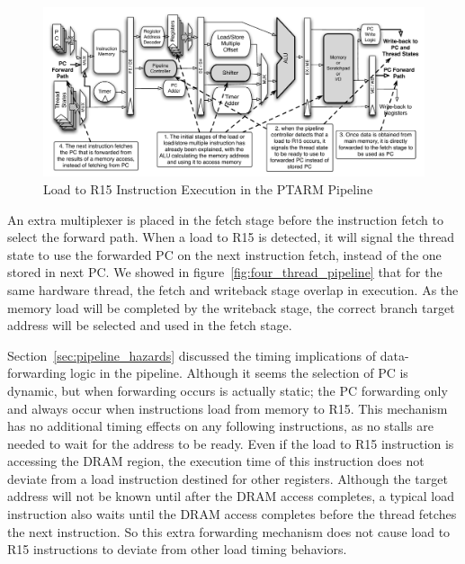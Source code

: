 \begin{figure}[h]
  
  \begin{center}
    \includegraphics[scale=.54]{figs/ld_to_pc_pipeline_implementation}
  \end{center}
  \vspace{-3mm}
  \caption{Load to R15 Instruction Execution in the PTARM Pipeline}
  \label{fig:ld_to_pc_pipeline_implementation}
\end{figure}

An extra multiplexer is placed in the fetch stage before the instruction fetch to select the forward path.
When a load to R15 is detected, it will signal the thread state to use the forwarded PC on the next instruction fetch, instead of the one stored in next PC.
We showed in figure~\ref{fig:four_thread_pipeline} that for the same hardware thread, the fetch and writeback stage overlap in execution.  
As the memory load will be completed by the writeback stage, the correct branch target address will be selected and used in the fetch stage.

Section~\ref{sec:pipeline_hazards} discussed the timing implications of data-forwarding logic in the pipeline.
Although it seems the selection of PC is dynamic, but when forwarding occurs is actually static; the PC forwarding only and always occur when instructions load from memory to R15.
This mechanism has no additional timing effects on any following instructions, as no stalls are needed to wait for the address to be ready. 
Even if the load to R15 instruction is accessing the DRAM region, the execution time of this instruction does not deviate from a load instruction destined for other registers.
Although the target address will not be known until after the DRAM access completes, a typical load instruction also waits until the DRAM access completes before the thread fetches the next instruction. 
So this extra forwarding mechanism does not cause load to R15 instructions to deviate from other load timing behaviors.

